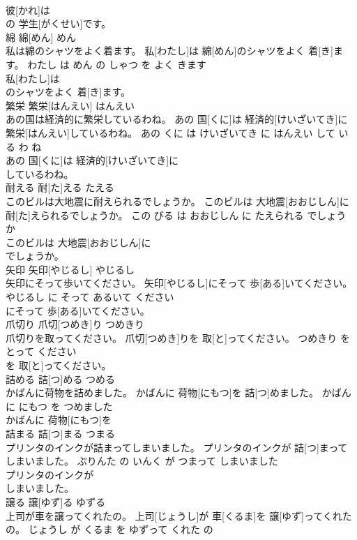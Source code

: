 \documentclass[8pt]{extreport}
\begin{document}
\begin{CJK}{UTF8}{min}
\\	彼[かれ]は
\\	の 学生[がくせい]です。			
\\	綿	綿[めん]	めん	
\\	私は綿のシャツをよく着ます。	私[わたし]は 綿[めん]のシャツをよく 着[き]ます。	わたし は めん の しゃつ を よく きます	
\\	私[わたし]は
\\	のシャツをよく 着[き]ます。			
\\	繁栄	繁栄[はんえい]	はんえい	
\\	あの国は経済的に繁栄しているわね。	あの 国[くに]は 経済的[けいざいてき]に 繁栄[はんえい]しているわね。	あの くに は けいざいてき に はんえい して いる わ ね	
\\	あの 国[くに]は 経済的[けいざいてき]に
\\	しているわね。			
\\	耐える	耐[た]える	たえる	
\\	このビルは大地震に耐えられるでしょうか。	このビルは 大地震[おおじしん]に 耐[た]えられるでしょうか。	この びる は おおじしん に たえられる でしょう か	
\\	このビルは 大地震[おおじしん]に
\\	でしょうか。			
\\	矢印	矢印[やじるし]	やじるし	
\\	矢印にそって歩いてください。	矢印[やじるし]にそって 歩[ある]いてください。	やじるし に そって あるいて ください	
\\	にそって 歩[ある]いてください。			
\\	爪切り	爪切[つめき]り	つめきり	
\\	爪切りを取ってください。	爪切[つめき]りを 取[と]ってください。	つめきり を とって ください	
\\	を 取[と]ってください。			
\\	詰める	詰[つ]める	つめる	
\\	かばんに荷物を詰めました。	かばんに 荷物[にもつ]を 詰[つ]めました。	かばん に にもつ を つめました	
\\	かばんに 荷物[にもつ]を
\\	詰まる	詰[つ]まる	つまる	
\\	プリンタのインクが詰まってしまいました。	プリンタのインクが 詰[つ]まってしまいました。	ぷりんた の いんく が つまって しまいました	
\\	プリンタのインクが
\\	しまいました。			
\\	譲る	譲[ゆず]る	ゆずる	
\\	上司が車を譲ってくれたの。	上司[じょうし]が 車[くるま]を 譲[ゆず]ってくれたの。	じょうし が くるま を ゆずって くれた の	

\end{CJK}
\end{document}
